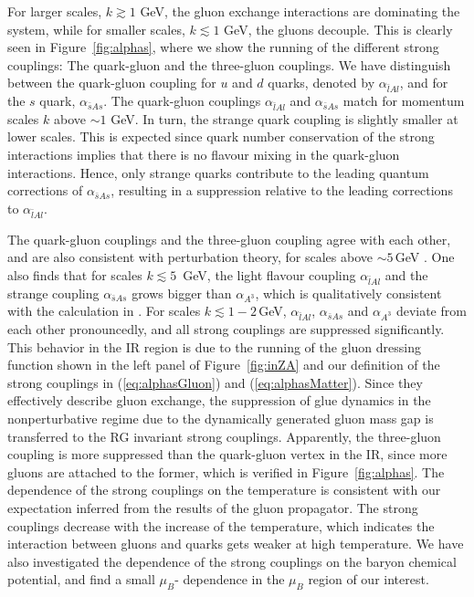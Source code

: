 \documentclass[%
reprint,
superscriptaddress,
showpacs,preprintnumbers,
 amsmath,amssymb,
 aps,
prd,
]{revtex4-1}
\def\Fig#1{Figure~\ref{#1}}
\def\eq#1{(\ref{#1})}
\begin{document}
For larger scales, $k\gtrsim 1$ GeV, the gluon exchange interactions
are dominating the system, while for smaller scales, $k\lesssim 1$
GeV, the gluons decouple. This is clearly seen in \Fig{fig:alphas},
where we show the running of the different strong couplings: The
quark-gluon and the three-gluon couplings.  We have distinguish
between the quark-gluon coupling for $u$ and $d$ quarks, denoted by
$\alpha_{\bar l A l}$, and for the $s$ quark, $\alpha_{\bar s A
  s}$. The quark-gluon couplings $\alpha_{\bar l A l}$ and
$\alpha_{\bar s A s}$ match for momentum scales $k$ above $\sim 1$
GeV. In turn, the strange quark coupling is slightly smaller at lower
scales. This is expected since quark number conservation of the strong
interactions implies that there is no flavour mixing in the
quark-gluon interactions. Hence, only strange quarks contribute to the
leading quantum corrections of $\alpha_{\bar s A s}$, resulting in a
suppression relative to the leading corrections to
$\alpha_{\bar l A l}$.

The quark-gluon couplings and the three-gluon coupling agree with each
other, and are also consistent with perturbation theory, for scales
above $\sim 5$\,GeV \cite{Braun:2014ata, Cyrol:2017ewj}. One also
finds that for scales $k\lesssim 5$\, GeV, the light flavour coupling
$\alpha_{\bar l A l}$ and the strange coupling $\alpha_{\bar s A s}$
grows bigger than $\alpha_{A^3}$, which is qualitatively consistent
with the calculation in \cite{Cyrol:2017ewj}. For scales
$k \lesssim 1-2$\,GeV, $\alpha_{\bar l A l}$, $\alpha_{\bar s A s}$
and $\alpha_{A^3}$ deviate from each other pronouncedly, and all
strong couplings are suppressed significantly. This behavior in the IR
region is due to the running of the gluon dressing function shown in
the left panel of \Fig{fig:inZA} and our definition of the strong
couplings in \eq{eq:alphasGluon} and \eq{eq:alphasMatter}. Since they
effectively describe gluon exchange, the suppression of glue dynamics
in the nonperturbative regime due to the dynamically generated gluon
mass gap is transferred to the RG invariant strong couplings.
Apparently, the three-gluon coupling is more suppressed than the
quark-gluon vertex in the IR, since more gluons are attached to the
former, which is verified in \Fig{fig:alphas}.  The dependence of the
strong couplings on the temperature is consistent with our expectation
inferred from the results of the gluon propagator. The strong
couplings decrease with the increase of the temperature, which
indicates the interaction between gluons and quarks gets weaker at
high temperature. We have also investigated the dependence of the
strong couplings on the baryon chemical potential, and find a small
$\mu_B$- dependence in the $\mu_B$ region of our interest.
\end{document}

